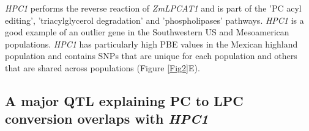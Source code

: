 \documentclass[9pt,twocolumn,twoside,lineno]{BioRxiv}
\begin{document}
\textit{HPC1} performs the reverse reaction of \textit{ZmLPCAT1} and is part of the 'PC acyl editing', 'triacylglycerol degradation' and 'phospholipases' pathways. 
\textit{HPC1} is a good example of an outlier gene in the Southwestern US and Mesoamerican populations.
\textit{HPC1} has particularly high PBE values in the Mexican highland population and contains SNPs that are unique for each population and others that are shared across populations (Figure \ref{Fig2}E). 

\subsection{A major QTL explaining PC to LPC conversion overlaps with \textit{HPC1}} 
\end{document}
